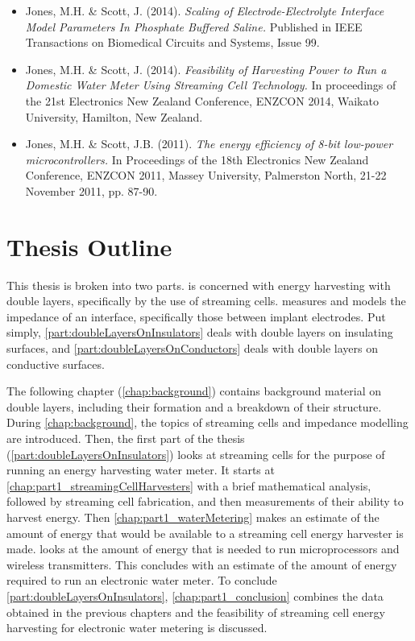   \begin{itemize}
    \item Jones, M.H. \& Scott, J. (2014). \emph{Scaling of Electrode-Electrolyte Interface Model Parameters In Phosphate Buffered Saline.} Published in IEEE Transactions on Biomedical Circuits and Systems, Issue 99.
    \item Jones, M.H. \& Scott, J. (2014). \emph{Feasibility of Harvesting Power to Run a Domestic Water Meter Using Streaming Cell Technology.} In proceedings of the 21st Electronics New Zealand Conference, ENZCON 2014, Waikato University, Hamilton, New Zealand.
    \item Jones, M.H. \& Scott, J.B. (2011). \emph{The energy efficiency of 8-bit low-power microcontrollers.} In Proceedings of the 18th Electronics New Zealand Conference, ENZCON 2011, Massey University, Palmerston North, 21-22 November 2011, pp. 87-90.
  \end{itemize}


\section{Thesis Outline}


  This thesis is broken into two parts.
   is concerned with energy harvesting with double layers, specifically by the use of streaming cells.
   measures and models the impedance of an interface, specifically those between implant electrodes.
  Put simply, \cref{part:doubleLayersOnInsulators} deals with double layers on insulating surfaces, and \cref{part:doubleLayersOnConductors} deals with double layers on conductive surfaces.

  The following chapter (\cref{chap:background}) contains background material on double layers, including their formation and a breakdown of their structure.
  During \cref{chap:background}, the topics of streaming cells and impedance modelling are introduced.
  Then, the first part of the thesis (\cref{part:doubleLayersOnInsulators}) looks at streaming cells for the purpose of running an energy harvesting water meter.
  It starts at \cref{chap:part1_streamingCellHarvesters} with a brief mathematical analysis, followed by streaming cell fabrication, and then measurements of their ability to harvest energy.
  Then \cref{chap:part1_waterMetering} makes an estimate of the amount of energy that would be available to a streaming cell energy harvester is made.
   looks at the amount of energy that is needed to run microprocessors and wireless transmitters.
  This concludes with an estimate of the amount of energy required to run an electronic water meter.
  To conclude \cref{part:doubleLayersOnInsulators}, \cref{chap:part1_conclusion} combines the data obtained in the previous chapters and the feasibility of streaming cell energy harvesting for electronic water metering is discussed.

